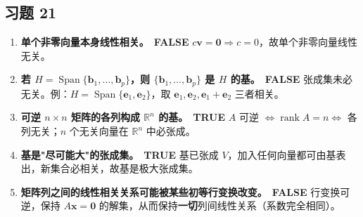 \documentclass[11pt]{ctexart}
\newcommand{\rank}{\operatorname{rank}}
\newcommand{\Span}{\operatorname{Span}}
\newcommand{\R}{\mathbb{R}}
\begin{document}
\subsection*{习题 21}
\begin{enumerate}[label=\textbf{\alph*.}]
\item \textbf{单个非零向量本身线性相关。}\ \textcolor{tfc}{\textbf{FALSE}}\quad
$c\mathbf v=\mathbf 0\Rightarrow c=0$，故单个非零向量线性无关。

\item \textbf{若 $H=\Span\{\mathbf b_1,\dots,\mathbf b_p\}$，则 $\{\mathbf b_1,\dots,\mathbf b_p\}$ 是 $H$ 的基。}\ \textcolor{tfc}{\textbf{FALSE}}\quad
张成集未必无关。例：$H=\Span\{\mathbf e_1,\mathbf e_2\}$，取 $\mathbf e_1,\mathbf e_2,\mathbf e_1+\mathbf e_2$ 三者相关。

\item \textbf{可逆 $n\times n$ 矩阵的各列构成 $\R^n$ 的基。}\ \textbf{\color{acc}TRUE}\quad
$A$ 可逆 $\iff\rank A=n\iff$ 各列无关；$n$ 个无关向量在 $\R^n$ 中必张成。

\item \textbf{基是"尽可能大"的张成集。}\ \textbf{\color{acc}TRUE}\quad
基已张成 $V$，加入任何向量都可由基表出，新集合必相关，故基是极大张成集。

\item \textbf{矩阵列之间的线性相关关系可能被某些初等行变换改变。}\ \textcolor{tfc}{\textbf{FALSE}}\quad
行变换可逆，保持 $A\mathbf x=\mathbf 0$ 的解集，从而保持\textbf{一切}列间线性关系（系数完全相同）。
\end{enumerate}
\end{document}
